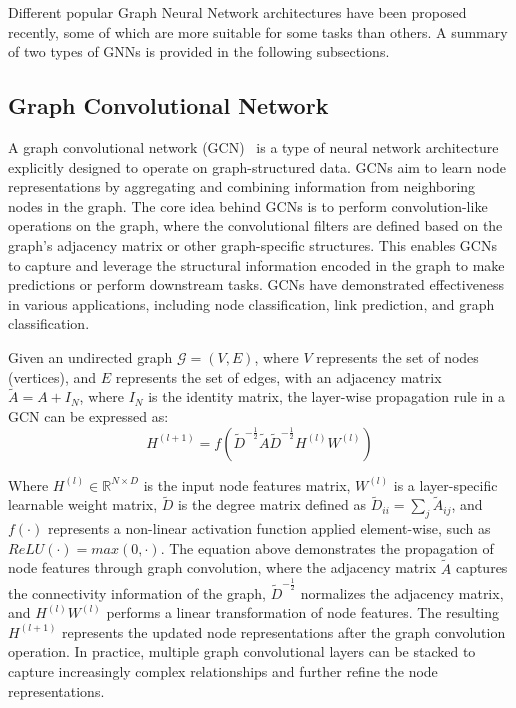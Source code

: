 Different popular Graph Neural Network architectures have been proposed recently, some of which are more suitable for some tasks than others.
A summary of two types of GNNs is provided in the following subsections.

\subsection{Graph Convolutional Network}
\label{subsec:graph_convolutional_network}%

A graph convolutional network (GCN)~\cite{DBLP:journals/corr/KipfW16, daigavane2021understanding} is a type of neural network architecture explicitly designed to operate on graph-structured data.
GCNs aim to learn node representations by aggregating and combining information from neighboring nodes in the graph.
The core idea behind GCNs is to perform convolution-like operations on the graph, where the convolutional filters are defined based on the graph's adjacency matrix or other graph-specific structures.
This enables GCNs to capture and leverage the structural information encoded in the graph to make predictions or perform downstream tasks.
GCNs have demonstrated effectiveness in various applications, including node classification, link prediction, and graph classification.

Given an undirected graph $\mathcal{G} = (V, E)$, where $V$ represents the set of nodes (vertices), and $E$ represents the set of edges, with an adjacency matrix $\tilde{A}=A+I_N$, where $I_N$ is the identity matrix, the layer-wise propagation rule in a GCN can be expressed as:
\begin{equation}
    \label{eq:gcn_convolution}
    H^{(l+1)} = f \left( \tilde{D}^{-\tfrac{1}{2}}  \tilde{A}  \tilde{D}^{-\tfrac{1}{2}}  H^{(l)}  W^{(l)} \right)
\end{equation}

Where $H^{(l)} \in \mathbb{R}^{N \times D}$ is the input node features matrix, $W^{(l)}$ is a layer-specific learnable weight matrix, $\tilde{D}$ is the degree matrix defined as $\tilde{D}_{ii} = \sum_{j} \tilde{A}_{ij}$, and $f(\cdot)$ represents a non-linear activation function applied element-wise, such as $ReLU(\cdot) = max(0, \cdot)$.
The equation above demonstrates the propagation of node features through graph convolution, where the adjacency matrix $\tilde{A}$ captures the connectivity information of the graph, $\tilde{D}^{-\tfrac{1}{2}}$ normalizes the adjacency matrix, and $H^{(l)}  W^{(l)}$ performs a linear transformation of node features.
The resulting $H^{(l+1)}$ represents the updated node representations after the graph convolution operation.
In practice, multiple graph convolutional layers can be stacked to capture increasingly complex relationships and further refine the node representations.

